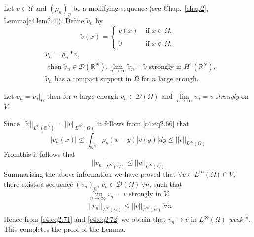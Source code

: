 Let $v \in \mathscr{U}$ and $(\rho_n)_n$ be a mollifying sequence 
(see Chap.~\ref{chap2}, Lemma\break\ref{c4:lem2.4}). Define $\tilde{v}_n$ by 
\begin{equation}
\tilde{v} (x) = 
\begin{cases}
v(x) & \text{ if } x \in \Omega, \\
{}\\
0 & \text{ if } x \not\in \Omega,
\end{cases}
\end{equation}
\begin{align}
& \tilde{v}_n = \rho_n * \tilde{v}, \tag{2.66}\label{c4:eq2.66}\\
& \text{ then } \tilde{v}_n  \in \mathscr{D} (\mathbb{R}^N), \lim_{n \to \infty} \tilde{v}_n = \tilde{v} \text{ strongly in } H^1(\mathbb{R}^N), \tag{2.67}\label{c4:eq2.67}\\
& \tilde{v}_n \text{ has a compact support in }\Omega \text{ for } n \text{ large enough}. \tag{2.68}\label{c4:eq2.68}
\end{align}

Let $v_n = \tilde{v}_n |_\Omega$ then for $n$ large enough $v_n \in \mathscr{D}(\Omega)$ and $\lim \limits_{n \to \infty} v_n = v$ \textit{strongly} on $V$.

Since $|| \tilde{v} ||_{L^\infty(\mathbb{R}^N)} = || v ||_{L^\infty(\Omega)}$ it follows from \eqref{c4:eq2.66} that 
\begin{equation}
|v_n(x) | \leq \int_{\mathbb{R}^N} \rho_n (x-y) | \tilde{v}(y) |dy \leq || v 
||_{L^\infty(\Omega)} \tag{2.69}\label{c4:eq2.69}
\end{equation}
From\pageoriginale  this it follows that 
\begin{equation}
|| v_n ||_{L^\infty(\Omega)} \leq || v ||_{L^\infty(\Omega)} \tag{2.70}\label{c4:eq2.70}
\end{equation}
Summarising the above information we have proved that $\forall v \in 
L^{\infty}(\Omega) \cap V$, there exists a sequence $(v_n)_n$, $v_n \in 
\mathscr{D} (\Omega)\, \forall n$, such that 
\begin{align}
& \lim_{n \to \infty} v_n = v \text{ strongly in } V, \tag{2.71}\label{c4:eq2.71}\\
& || v_n ||_{L^{\infty}(\Omega)} \leq || v ||_{L^\infty(\Omega)}\, \forall n. \tag{2.72}\label{c4:eq2.72}
\end{align}
Hence from \eqref{c4:eq2.71} and \eqref{c4:eq2.72} we obtain that $v_n \to v$ in $L^{\infty}(\Omega)$ \textit{weak} *. This completes the proof of the Lemma.


